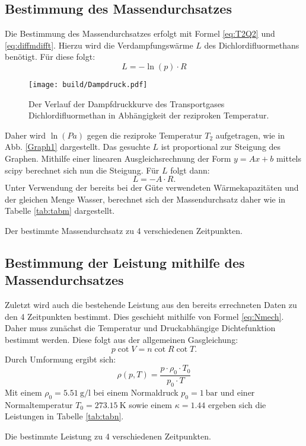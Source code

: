 \subsection{Bestimmung des Massendurchsatzes}
Die Bestimmung des Massendurchsatzes erfolgt mit Formel \ref{eq:T2Q2} und \ref{eq:diffmdifft}.
Hierzu wird die Verdampfungswärme $L$ des Dichlordifluormethans benötigt. Für diese folgt:
\begin{equation}
  L = -\ln(p)\cdot R
\end{equation}
\begin{figure}
 \centering
 \caption{Der Verlauf der Dampfdruckkurve des Transportgases Dichlordifluormethan in Abhängigkeit der reziproken Temperatur.}
 \texttt{[image: build/Dampdruck.pdf]}
 \label{fig:Graph1}
\end{figure}
Daher wird $\ln(Pa)$ gegen die reziproke Temperatur $T_2$ aufgetragen, wie in Abb. \ref{Graph1} dargestellt. Das gesuchte $L$ ist proportional zur Steigung des Graphen.
Mithilfe einer linearen Ausgleichsrechnung der Form $y=Ax+b$ mittels scipy
berechnet sich nun die Steigung. Für $L$ folgt dann:
\begin{equation}
  L = -A\cdot R\text{.}\label{eq:LausA}
\end{equation}
Unter Verwendung der bereits bei der Güte verwendeten Wärmekapazitäten und der gleichen
 Menge Wasser, berechnet sich der Massendurchsatz daher wie in Tabelle \ref{tab:tabm} dargestellt.

 \begin{table}
   \centering
   \caption{Der bestimmte Massendurchsatz zu 4 verschiedenen Zeitpunkten.}
   \label{tab:massen}
 \end{table}

\subsection{Bestimmung der Leistung mithilfe des Massendurchsatzes}
Zuletzt wird auch die bestehende Leistung aus den bereits errechneten Daten zu den 4 Zeitpunkten bestimmt.
Dies geschieht mithilfe von Formel \ref{eq:Nmech}. Daher muss zunächst die Temperatur
und Druckabhängige Dichtefunktion bestimmt werden. Diese folgt aus der allgemeinen Gasgleichung:
\begin{equation}
  p\cot V = n\cot R\cot T\text{.}
\end{equation}
Durch Umformung ergibt sich:
\begin{equation}
  \rho(p,T) = \frac{p\cdot \rho_0\cdot T_0}{p_0\cdot T}
\end{equation}
Mit einem $\rho_0 = \SI{5.51}{\gram\per\litre}$ \cite{V206} bei einem Normaldruck $p_0 = \SI{1}{\bar}$
und einer Normaltemperatur $T_0 = \SI{273.15}{\kelvin}$ sowie einem $\kappa = 1.44$ \cite{V206} ergeben sich die Leistungen in Tabelle \ref{tab:tabn}.

\begin{table}
  \centering
  \caption{Die bestimmte Leistung zu 4 verschiedenen Zeitpunkten.}
  \label{tab:Leistung}
\end{table}
